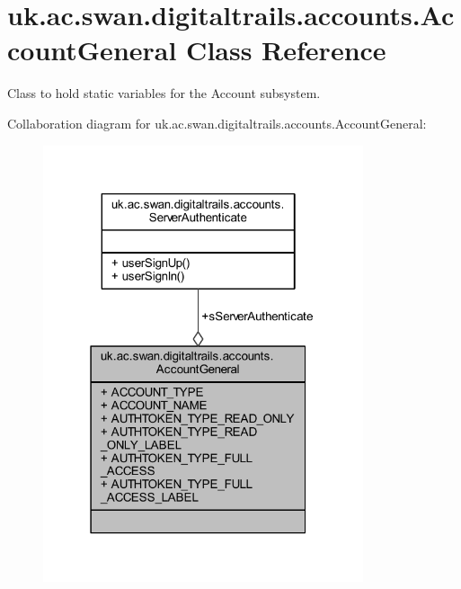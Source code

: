 \hypertarget{classuk_1_1ac_1_1swan_1_1digitaltrails_1_1accounts_1_1_account_general}{\section{uk.\+ac.\+swan.\+digitaltrails.\+accounts.\+Account\+General Class Reference}
\label{classuk_1_1ac_1_1swan_1_1digitaltrails_1_1accounts_1_1_account_general}
}


Class to hold static variables for the Account subsystem.  




Collaboration diagram for uk.\+ac.\+swan.\+digitaltrails.\+accounts.\+Account\+General\+:
\nopagebreak
\begin{figure}[H]
\begin{center}
\leavevmode
\includegraphics[width=267pt]{classuk_1_1ac_1_1swan_1_1digitaltrails_1_1accounts_1_1_account_general__coll__graph}
\end{center}
\end{figure}
